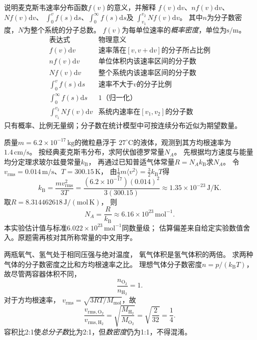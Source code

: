 \problemtext 说明麦克斯韦速率分布函数$f(v)$的意义，并解释
$f(v)\mathrm dv$、$nf(v)\mathrm dv$、$Nf(v)\mathrm dv$、
$\int_0^v f(s)\mathrm ds$、$\int_0^\infty f(s)\mathrm ds$及
$\int_{v_1}^{v_2}Nf(v)\mathrm dv$。
其中$n$为分子数密度，$N$为整个系统的分子总数。
\workings
$f(v)$为每单位速率的\emph{概率密度}，单位为$\mathrm{s/m}$。
\[
\begin{array}{l|l}
\text{表达式}&\text{物理意义}\\\hline
f(v)\mathrm dv&\text{速率落在}[v,v+\mathrm dv]\text{的分子所占比例}\\
nf(v)\mathrm dv&\text{单位体积内该速率区间的分子数}\\
Nf(v)\mathrm dv&\text{整个系统内该速率区间的分子数}\\
\int_0^v f(s)\mathrm ds&\text{速率不大于}v\text{的分子比例}\\
\int_0^\infty f(s)\mathrm ds&1\text{（归一化）}\\
\int_{v_1}^{v_2}Nf(v)\mathrm dv&
\text{系统内速率在}[v_1,v_2]\text{的分子数}
\end{array}
\]
\crosscheck 只有概率、比例无量纲；分子数在统计模型中可按连续分布近似为期望数量。

\problemtext 质量$m=6.2\times10^{-17}\,\mathrm{kg}$的微粒悬浮于
$27^\circ\mathrm C$的液体，观测到其方均根速率为$1.4\,\mathrm{cm/s}$。
按经典麦克斯韦分布，求阿伏伽德罗常量$N_A$。
\workings
先根据均方速度与能量均分定理求玻尔兹曼常量$k_{\mathrm B}$，
再通过已知普适气体常量$R=N_Ak_{\mathrm B}$求$N_A$。
令$v_{\mathrm{rms}}=0.014\,\mathrm{m/s}$、$T=300.15\,\mathrm K$，
由$\tfrac12m\langle v^2\rangle=\tfrac32k_{\mathrm B}T$得
\[
\boxed{k_{\mathrm B}=\frac{m v_{\mathrm{rms}}^2}{3T}
=\frac{(6.2\times10^{-17})(0.014)^2}{3(300.15)}
\approx1.35\times10^{-23}\,\mathrm{J/K}}.
\]
取$R=8.314462618\,\mathrm{J/(mol\,K)}$，
则
\[
\boxed{N_A=\frac{R}{k_{\mathrm B}}
\approx6.16\times10^{23}\,\mathrm{mol^{-1}}}.
\]
\crosscheck 本实验估计值与标准$6.022\times10^{23}\,\mathrm{mol^{-1}}$同数量级；
估算偏差来自给定实验数值舍入。原题需再核对其所称常量的中文用字。

\problemtext 两瓶氧气、氢气处于相同压强与绝对温度，
氧气体积是氢气体积的两倍。
求两种气体的分子数密度之比和方均根速率之比。
\workings
理想气体分子数密度$n=p/(k_{\mathrm B}T)$，
故尽管两容器体积不同，
\[
\boxed{\frac{n_{\mathrm{O_2}}}{n_{\mathrm{H_2}}}=1}.
\]
对于方均根速率，
$v_{\mathrm{rms}}=\sqrt{3RT/M_{\mathrm{mol}}}$，故
\[
\boxed{\frac{v_{\mathrm{rms,O_2}}}{v_{\mathrm{rms,H_2}}}
=\sqrt{\frac{M_{\mathrm{H_2}}}{M_{\mathrm{O_2}}}}
=\sqrt{\frac{2}{32}}=\frac14}.
\]
\crosscheck 容积比2:1使\emph{总分子数}比为2:1，但\emph{数密度}仍为1:1，不得混淆。


